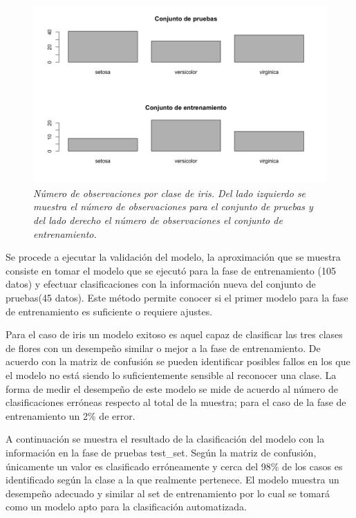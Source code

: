 \documentclass[letterpaper,12pt, spanish, oneside]{book} %
\begin{document}
\begin{figure}[H]
\centering
\includegraphics[width=1\textwidth]{fase8.png}
\caption{\label{fig:frog2}\textit{Número de observaciones por clase de iris. Del lado izquierdo se muestra el número de observaciones para el conjunto de pruebas y del lado derecho el número de observaciones el conjunto de entrenamiento.}}
\end{figure}

Se procede a ejecutar la validación del modelo, la aproximación que se muestra consiste en tomar el modelo que se ejecutó para la fase de entrenamiento (105 datos) y efectuar clasificaciones con la información nueva del conjunto de pruebas(45 datos). Este método permite conocer si el primer modelo para la fase de entrenamiento es suficiente o requiere ajustes. 

Para el caso de iris un modelo exitoso es aquel capaz de clasificar las tres clases de flores con un desempeño similar o mejor a la fase de entrenamiento. De acuerdo con la matriz de confusión se pueden identificar posibles fallos en los que el modelo no está siendo lo suficientemente sensible al reconocer una clase. La forma de medir el desempeño de este modelo se mide de acuerdo al número de clasificaciones erróneas respecto al total de la muestra; para el caso de la fase de entrenamiento un 2\% de error.

A continuación se muestra el resultado de la clasificación del modelo con la información en la fase de pruebas test\_set. Según la matriz de confusión, únicamente un valor es clasificado erróneamente y cerca del 98\% de los casos es identificado según la clase a la que realmente pertenece. El modelo muestra un desempeño adecuado y similar al set de entrenamiento por lo cual se tomará como un modelo apto para la clasificación automatizada.
\end{document}
